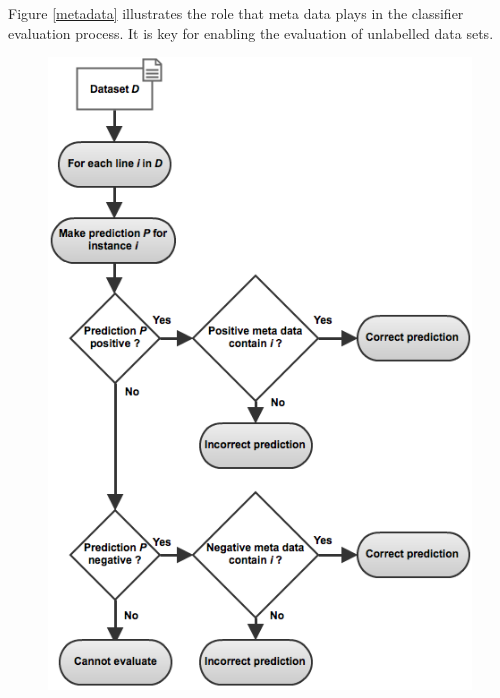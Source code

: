 \documentclass[twoside,a4paper]{refart}
\begin{document}
Figure \ref{metadata} illustrates the role that meta data plays in the classifier evaluation process. It is key for enabling the evaluation of unlabelled data sets.
\begin{figure}[!htbp]
  \begin{center}
    \leavevmode
    \ifpdf
      \includegraphics[keepaspectratio,scale=0.464]{MetaDataEvalFlow.png}
    \else

\end{center}
\end{figure}
\end{document}
